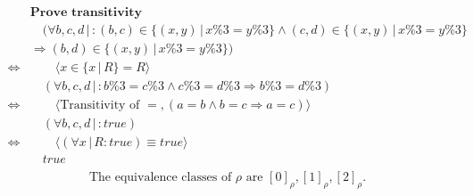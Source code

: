 \documentclass{article}
\begin{document}
    \begin{align*}
    & \textbf{Prove transitivity} \\
    & \quad (\forall b,c,d\,|\,: (b,c)\in \{(x,y)\,|\, x\%3=y\%3\} \land (c,d)\in \{(x,y)\,|\, x\%3=y\%3\}\\
    & \Longrightarrow (b,d)\in\{(x,y)\,|\, x\%3=y\%3\}) \\
    \Longleftrightarrow & \qquad \langle x\in\{x\,|\,R\}=R \rangle \\
    & \quad (\forall b,c,d\,|\,: b\%3=c\%3 \land c\%3=d\%3 \Longrightarrow b\%3=d\%3) \\
    \Longleftrightarrow & \qquad \langle \text{Transitivity of } =, (a=b\land b=c \Longrightarrow a=c) \rangle \\
    & \quad (\forall b,c,d\,|\,: true) \\
    \Longleftrightarrow & \qquad \langle (\forall x\,|\, R: true) \equiv true \rangle \\
    & \quad true \\
    \end{align*}
    \begin{equation*}
        \text{The equivalence classes of } \rho \text{ are } [0]_\rho, [1]_\rho, [2]_\rho.
    \end{equation*}
    
\end{document}
